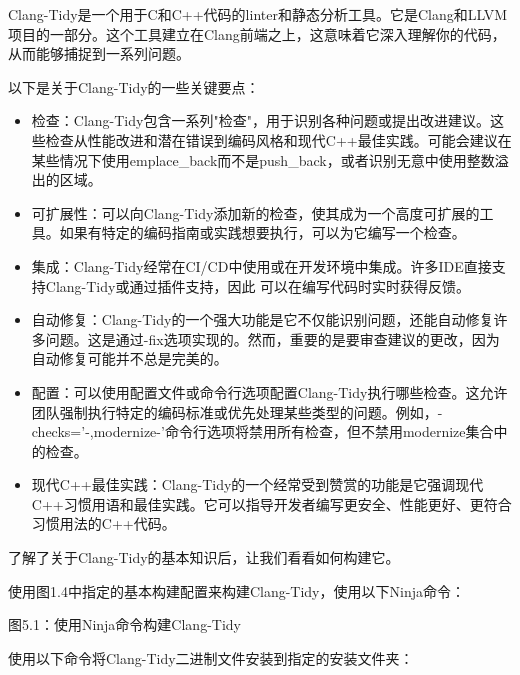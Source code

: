 


Clang-Tidy是一个用于C和C++代码的linter和静态分析工具。它是Clang和LLVM项目的一部分。这个工具建立在Clang前端之上，这意味着它深入理解你的代码，从而能够捕捉到一系列问题。

以下是关于Clang-Tidy的一些关键要点：

\begin{itemize}
\item
检查：Clang-Tidy包含一系列"检查"，用于识别各种问题或提出改进建议。这些检查从性能改进和潜在错误到编码风格和现代C++最佳实践。可能会建议在某些情况下使用emplace\_back而不是push\_back，或者识别无意中使用整数溢出的区域。

\item
可扩展性：可以向Clang-Tidy添加新的检查，使其成为一个高度可扩展的工具。如果有特定的编码指南或实践想要执行，可以为它编写一个检查。

\item
集成：Clang-Tidy经常在CI/CD中使用或在开发环境中集成。许多IDE直接支持Clang-Tidy或通过插件支持，因此 可以在编写代码时实时获得反馈。

\item
自动修复：Clang-Tidy的一个强大功能是它不仅能识别问题，还能自动修复许多问题。这是通过-fix选项实现的。然而，重要的是要审查建议的更改，因为自动修复可能并不总是完美的。

\item
配置：可以使用配置文件或命令行选项配置Clang-Tidy执行哪些检查。这允许团队强制执行特定的编码标准或优先处理某些类型的问题。例如，-checks='-,modernize-'命令行选项将禁用所有检查，但不禁用modernize集合中的检查。

\item
现代C++最佳实践：Clang-Tidy的一个经常受到赞赏的功能是它强调现代C++习惯用语和最佳实践。它可以指导开发者编写更安全、性能更好、更符合习惯用法的C++代码。
\end{itemize}

了解了关于Clang-Tidy的基本知识后，让我们看看如何构建它。


使用图1.4中指定的基本构建配置来构建Clang-Tidy，使用以下Ninja命令：


\begin{center}
图5.1：使用Ninja命令构建Clang-Tidy
\end{center}

使用以下命令将Clang-Tidy二进制文件安装到指定的安装文件夹：

